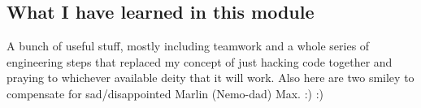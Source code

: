 

\subsection{What I have learned in this module}
A bunch of useful stuff, mostly including teamwork and a whole series of engineering steps that replaced my concept of just hacking code together and praying to whichever available deity that it will work.
Also here are two smiley to compensate for sad/disappointed Marlin (Nemo-dad) Max.
	:) :)
